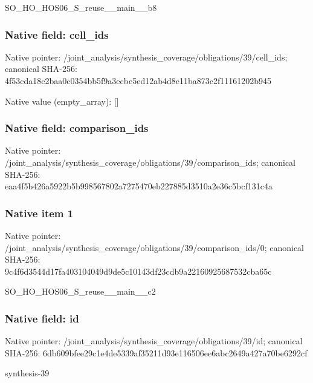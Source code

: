 \documentclass[10pt,a4paper]{article}
\begin{document}
\begingroup\raggedright\sloppy SO\_\allowbreak{}HO\_\allowbreak{}HOS06\_\allowbreak{}S\_\allowbreak{}reuse\_\allowbreak{}\_\allowbreak{}main\_\allowbreak{}\_\allowbreak{}b8\par\endgroup

\subsubsection{Native field: cell\_\allowbreak{}ids}
Native pointer: /joint\_\allowbreak{}analysis/synthesis\_\allowbreak{}coverage/obligations/39/cell\_\allowbreak{}ids; canonical SHA-256: 4f53cda18c2baa0c0354bb5f9a3ecbe5ed12ab4d8e11ba873c2f11161202b945

Native value (empty\_\allowbreak{}array): []

\subsubsection{Native field: comparison\_\allowbreak{}ids}
Native pointer: /joint\_\allowbreak{}analysis/synthesis\_\allowbreak{}coverage/obligations/39/comparison\_\allowbreak{}ids; canonical SHA-256: eaa4f5b426a5922b5b998567802a7275470eb227885d3510a2e36c5bcf131c4a

\subsubsection{Native item 1}
Native pointer: /joint\_\allowbreak{}analysis/synthesis\_\allowbreak{}coverage/obligations/39/comparison\_\allowbreak{}ids/0; canonical SHA-256: 9c4f6d3544d17fa403104049d9de5c10143df23cdb9a22160925687532cba65c

\begingroup\raggedright\sloppy SO\_\allowbreak{}HO\_\allowbreak{}HOS06\_\allowbreak{}S\_\allowbreak{}reuse\_\allowbreak{}\_\allowbreak{}main\_\allowbreak{}\_\allowbreak{}c2\par\endgroup

\subsubsection{Native field: id}
Native pointer: /joint\_\allowbreak{}analysis/synthesis\_\allowbreak{}coverage/obligations/39/id; canonical SHA-256: 6db609bfee29c1e4de5339af35211d93e116506ee6abc2649a427a70be6292cf

\begingroup\raggedright\sloppy synthesis-39\par\endgroup
\end{document}
